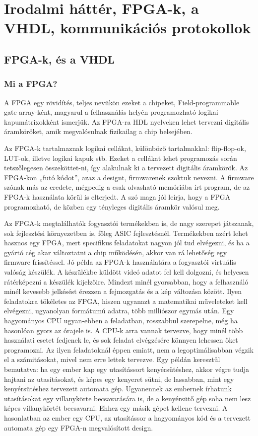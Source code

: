 \documentclass[a4paper,12pt,oneside]{book}
\begin{document}
\chapter{Irodalmi háttér, FPGA-k, a VHDL, kommunikációs protokollok}
\section{FPGA-k, és a VHDL}
\subsection{Mi a FPGA?}

A FPGA egy rövidítés, teljes nevükön ezeket a chipeket, Field-programmable gate array-ként, magyarul a felhasználás helyén programozható logikai kapumátrixokként ismerjük. Az FPGA-ra HDL nyelveken lehet tervezni digitális áramköröket, amik megvalósulnak fizikailag a chip belsejében. 

Az FPGA-k tartalmaznak logikai cellákat, különböző tartalmakkal: flip-flop-ok, LUT-ok, illetve logikai kapuk stb. Ezeket a cellákat lehet programozás során tetszőlegesen összeköttet-ni, így alakulnak ki a tervezett digitális áramkörök. Az FPGA-kon „futó kódot”, azaz a designt, firmwarenek szoktuk nevezni. A firmware szónak más az eredete, mégpedig a csak olvasható memóriába írt program, de az FPGA-k használata körül is elterjedt. A szó maga jól leírja, hogy a FPGA programozható, de közben egy tényleges digitális áramkör valósul meg.

Az FPGA-k megtalálhatók fogyasztói termékekben is, de nagy szerepet játszanak, sok fejlesztési környezetben is, főleg ASIC fejlesztésnél. Termékekben azért lehet hasznos egy FPGA, mert specifikus feladatokat nagyon jól tud elvégezni, és ha a gyártó cég akar változtatni a chip működésén, akkor van rá lehetőség egy firmware frissítéssel. Jó példa az FPGA-k használatára a fogyasztói virtuális valóság készülék. A készülékbe küldött videó adatot fel kell dolgozni, és helyesen rátérképezni a készülék kijelzőire. Mindezt minél gyorsabban, hogy a felhasználó minél kevesebb jelkésést érezzen a fejmozgatás és a kép változása között. Ilyen feladatokra tökéletes az FPGA, hiszen ugyanazt a matematikai műveleteket kell elvégezni, ugyanolyan formátumú adatra, több milliószor egymás után. Egy hagyományos CPU ugyan-ebben a feladatban, rosszabbul szerepelne, még ha hasonlóan gyors az órajele is. A CPU-k arra vannak tervezve, hogy minél több használati esetet fedjenek le, és sok feladat elvégzésére könnyen lehessen őket programozni. Az ilyen feladatoknál éppen emiatt, nem a legoptimálisabban végzik el a számitásokat, mivel nem erre lettek tervezve. Egy példán keresztül bemutatva: ha egy ember kap egy utasítássort kenyérsütéshez, akkor végre tudja hajtani az utasításokat, és képes egy kenyeret sütni, de lassabban, mint egy kenyérsütéshez tervezett automata gép. Ugyanennek az embernek írhatunk utasításokat egy villanykörte becsavarására is, de a kenyérsütő gép soha nem lesz képes villanykörtét becsavarni. Ehhez egy másik gépet kellene tervezni. A hasonlatban az ember egy CPU, az utasítássor a hagyományos kód és a tervezett automata gép egy FPGA-n megvalósított design.
\end{document}
